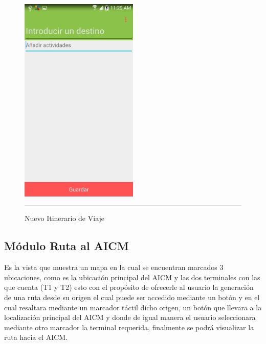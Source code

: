 \begin{figure}[h]
	\centering
		\includegraphics[width=0.5\textwidth]{Figuras/nuevoiti.png}
		\rule{30em}{0.5pt}
	\caption[Nuevo Itinerario de viaje]{Nuevo Itinerario de Viaje}
	\label{fig:nuevoItinerario}
\end{figure}
\clearpage

\subsection{Módulo Ruta al AICM}
Es la vista que muestra un mapa en la cual se encuentran marcados 3 ubicaciones, como es la ubicación principal del AICM y 
las dos terminales con las que cuenta (T1 y T2) esto con el propósito de ofrecerle al usuario la generación de una ruta desde 
su origen el cual puede ser accedido mediante un botón y en el cual resaltara mediante un marcador táctil dicho origen, 
un botón que llevara a la localización principal del AICM y donde de igual manera el usuario seleccionara mediante otro marcador
la terminal requerida, finalmente se podrá visualizar la ruta hacia el AICM.

